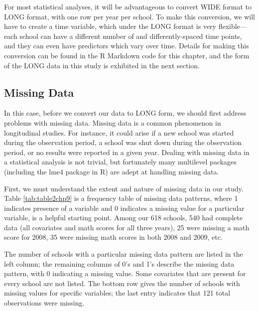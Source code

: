 \documentclass[
]{krantz}
\begin{document}
For most statistical analyses, it will be advantageous to convert WIDE format to LONG format, with one row per year per school. To make this conversion, we will have to create a time variable, which under the LONG format is very flexible---each school can have a different number of and differently-spaced time points, and they can even have predictors which vary over time. Details for making this conversion can be found in the R Markdown code for this chapter, and the form of the LONG data in this study is exhibited in the next section.

\hypertarget{missing}{%
\subsection{Missing Data}\label{missing}}

In this case, before we convert our data to LONG form, we should first address problems with missing data.  Missing data is a common phenomenon in longitudinal studies. For instance, it could arise if a new school was started during the observation period, a school was shut down during the observation period, or no results were reported in a given year. Dealing with missing data in a statistical analysis is not trivial, but fortunately many multilevel packages (including the lme4 package in R) are adept at handling missing data.

First, we must understand the extent and nature of missing data in our study. Table \ref{tab:table2chp9} is a frequency table of missing data patterns, where 1 indicates presence of a variable and 0 indicates a missing value for a particular variable, is a helpful starting point. Among our 618 schools, 540 had complete data (all covariates and math scores for all three years), 25 were missing a math score for 2008, 35 were missing math scores in both 2008 and 2009, etc.

The number of schools with a particular missing data pattern are listed in the left column; the remaining columns of 0's and 1's describe the missing data pattern, with 0 indicating a missing value. Some covariates that are present for every school are not listed. The bottom row gives the number of schools with missing values for specific variables; the last entry indicates that 121 total observations were missing.
\end{document}
